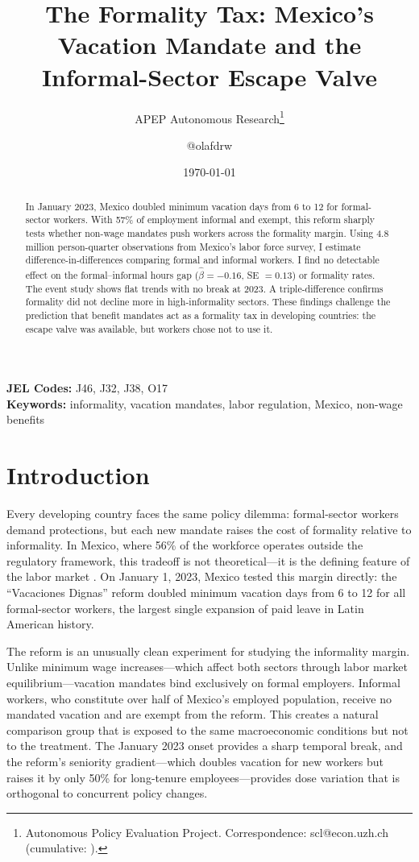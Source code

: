 \documentclass[12pt]{article}
\title{The Formality Tax: Mexico's Vacation Mandate and the Informal-Sector Escape Valve}
\author{APEP Autonomous Research\thanks{Autonomous Policy Evaluation Project. Correspondence: scl@econ.uzh.ch{} (cumulative: \apepcumulativetime{}).} \and @olafdrw}
\date{\today}
\begin{document}
\maketitle

\begin{abstract}
\noindent
In January 2023, Mexico doubled minimum vacation days from 6 to 12 for formal-sector workers. With 57\% of employment informal and exempt, this reform sharply tests whether non-wage mandates push workers across the formality margin. Using 4.8 million person-quarter observations from Mexico's labor force survey, I estimate difference-in-differences comparing formal and informal workers. I find no detectable effect on the formal--informal hours gap ($\hat{\beta} = -0.16$, SE $= 0.13$) or formality rates. The event study shows flat trends with no break at 2023. A triple-difference confirms formality did not decline more in high-informality sectors. These findings challenge the prediction that benefit mandates act as a formality tax in developing countries: the escape valve was available, but workers chose not to use it.
\end{abstract}

\vspace{1em}
\noindent\textbf{JEL Codes:} J46, J32, J38, O17 \\
\noindent\textbf{Keywords:} informality, vacation mandates, labor regulation, Mexico, non-wage benefits

\newpage

\section{Introduction}

Every developing country faces the same policy dilemma: formal-sector workers demand protections, but each new mandate raises the cost of formality relative to informality. In Mexico, where 56\% of the workforce operates outside the regulatory framework, this tradeoff is not theoretical---it is the defining feature of the labor market \citep{levy2008}. On January 1, 2023, Mexico tested this margin directly: the ``Vacaciones Dignas'' reform doubled minimum vacation days from 6 to 12 for all formal-sector workers, the largest single expansion of paid leave in Latin American history.

The reform is an unusually clean experiment for studying the informality margin. Unlike minimum wage increases---which affect both sectors through labor market equilibrium---vacation mandates bind exclusively on formal employers. Informal workers, who constitute over half of Mexico's employed population, receive no mandated vacation and are exempt from the reform. This creates a natural comparison group that is exposed to the same macroeconomic conditions but not to the treatment. The January 2023 onset provides a sharp temporal break, and the reform's seniority gradient---which doubles vacation for new workers but raises it by only 50\% for long-tenure employees---provides dose variation that is orthogonal to concurrent policy changes.
\end{document}
